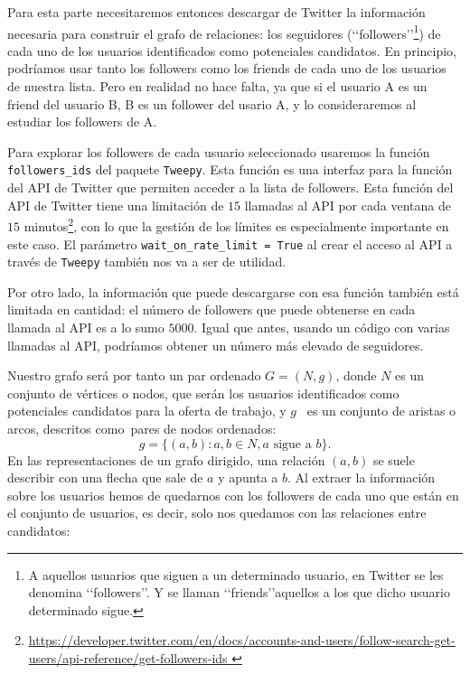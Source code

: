 Para esta parte necesitaremos entonces descargar de Twitter la información
necesaria para construir el grafo de relaciones: los seguidores 
(\lq\lq followers\rq\rq\footnote{A aquellos usuarios que siguen a un determinado usuario, 
en Twitter se les denomina \lq\lq followers\rq\rq. Y se llaman \lq\lq friends\rq\rq aquellos
a los que dicho usuario determinado sigue.})
de cada uno de los usuarios identificados como potenciales candidatos. 
En principio, podríamos usar tanto los followers como los friends de cada uno 
de los usuarios de nuestra lista. Pero en realidad no hace falta, ya que si el usuario
A es un friend del usuario B, B es un follower del usario A, y lo consideraremos al
estudiar los followers de A. 

Para explorar los followers de cada usuario seleccionado usaremos la función 
{\tt followers\_ids} del paquete {\tt Tweepy}. Esta función es una interfaz
para la función del API de Twitter que permiten acceder a la lista de 
followers. Esta función del API de Twitter
tiene una limitación de $15$ llamadas al API por cada ventana de $15$ 
minutos\footnote{\url{https://developer.twitter.com/en/docs/accounts-and-users/follow-search-get-users/api-reference/get-followers-ids }},
con lo que la gestión de los límites es especialmente importante en este caso.
El parámetro {\tt wait\_on\_rate\_limit = True} al crear el acceso al API a 
través de {\tt Tweepy} también nos va a ser de utilidad.

Por otro lado, la información que puede descargarse con esa función también
está limitada en cantidad: el número de followers que puede obtenerse en cada llamada 
al API es a lo sumo $5000$. Igual que antes,
usando un código con varias llamadas al API, podríamos obtener un número más elevado de 
seguidores.

Nuestro grafo será por tanto un par ordenado 
$G=(N,g)$, donde $N$ es un conjunto de vértices o nodos, que serán los usuarios
identificados como potenciales candidatos para la oferta de trabajo, y $g$
 es un conjunto de aristas o arcos, descritos como pares de nodos ordenados:
$$g=\{(a,b): a,b\in N, a \mbox{ sigue a }b\}.$$
En las representaciones de un grafo dirigido, una relación $(a,b)$ se 
suele describir con una flecha que sale de $a$ y apunta a $b$.
Al extraer la información sobre los usuarios hemos de quedarnos con los followers
de cada uno que están en el conjunto de usuarios, es decir, solo nos quedamos con
las relaciones entre candidatos:


